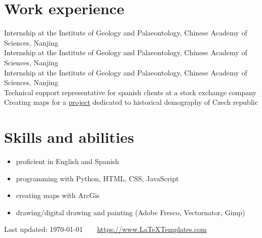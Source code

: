 \documentclass[11pt]{article} %
\begin{document}

\section*{Work experience}
 Internship at the Institute of Geology and Palaeontology, Chinese Academy of Sciences, Nanjing \\
 Internship at the Institute of Geology and Palaeontology, Chinese Academy of Sciences, Nanjing \\
 Internship at the Institute of Geology and Palaeontology, Chinese Academy of Sciences, Nanjing \\
 Technical support representative for spanish clients at a stock exchange company \\
 Creating maps for a \href{http://www.zaniklekrajiny.cz}{project} dedicated to historical demography of Czech republic


\section*{Skills and abilities}

\begin{multicols}{2}
\begin{itemize}
\itemsep -0.5em
\item proficient in English and Spanish 
\item programming with Python, HTML, CSS, JavaScript 
\item creating maps with ArcGis 
\item drawing/digital drawing and painting (Adobe Fresco, Vectornator, Gimp) 
	
\end{itemize}
\end{multicols}
\vfill %


\begin{center}
	\scriptsize
	Last updated: \today~~\raisebox{-0.5pt}{\textbullet}~~\href{https://www.LaTeXTemplates.com}{https://www.LaTeXTemplates.com}
\end{center}

\end{document}
